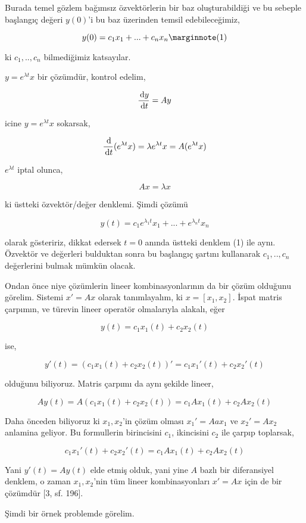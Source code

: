 \documentclass[12pt,fleqn]{article}\usepackage{../../common}
\begin{document}
Burada temel gözlem bağımsız özvektörlerin bir baz oluşturabildiği ve bu
sebeple başlangıç değeri $y(0)$'i bu baz üzerinden temsil edebileceğimiz,

$$
y(0) = c_1 x_1 + ... + c_n x_n
\mlabel{1}
$$

ki $c_1,..,c_n$ bilmediğimiz katsayılar.

$y = e^{\lambda t} x$ bir çözümdür, kontrol edelim,

$$
\frac{\,\mathrm{d} y}{\,\mathrm{d} t} = A y
$$

icine $y = e^{\lambda t} x$ sokarsak,

$$
\frac{\,\mathrm{d} }{\,\mathrm{d} t} ( e^{\lambda t} x) =
\lambda e^{\lambda t} x =
A (e^{\lambda  t} x)
$$

$e^{\lambda  t}$  iptal olunca,

$$
Ax = \lambda x 
$$

ki üstteki özvektör/değer denklemi. Şimdi çözümü

$$
y(t) = c_1 e^{\lambda_1 t} x_1 + ... + e^{\lambda_n t} x_n
$$

olarak gösteririz, dikkat edersek $t=0$ anında üstteki denklem (1) ile aynı.
Özvektör ve değerleri bulduktan sonra bu başlangıç şartını kullanarak
$c_1,..,c_n$ değerlerini bulmak mümkün olacak.

Ondan önce niye çözümlerin lineer kombinasyonlarının da bir çözüm olduğunu
görelim. Sistemi $x' = Ax$ olarak tanımlayalım, ki $x = [x_1, x_2]$.  İspat
matris çarpımın, ve türevin lineer operatör olmalarıyla alakalı, eğer

$$
y(t) = c_1 x_1(t) + c_2 x_2(t)
$$

ise,

$$
y'(t) = (c_1 x_1(t) + c_2 x_2(t))' = c_1 x_1'(t) + c_2 x_2'(t)
$$

olduğunu biliyoruz. Matris çarpımı da aynı şekilde lineer,

$$
A y(t) = A(c_1 x_1(t) + c_2 x_2(t)) = c_1 A x_1(t) + c_2 A x_2(t)
$$

Daha önceden biliyoruz ki $x_1,x_2$'in çözüm olması $x_1'=Aax_1$ ve $x_2' = A
x_2$ anlamina geliyor. Bu formullerin birincisini $c_1$, ikincisini $c_2$ ile
çarpıp toplarsak,

$$
c_1 x_1'(t) + c_2 x_2'(t) = c_1 A x_1(t) + c_2 A x_2(t)
$$

Yani $y'(t) = A y(t)$ elde etmiş olduk, yani yine $A$ bazlı bir diferansiyel
denklem, o zaman $x_1,x_2$'nin tüm lineer kombinasyonları $x' = Ax$ için de bir
çözümdür [3, sf. 196].

Şimdi bir örnek problemde görelim.
\end{document}
